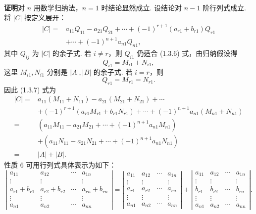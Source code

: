 \documentclass[UTF8,12pt,a4paper,fontset=fandol]{ctexart}
\begin{document}
\noindent\textbf{证明}\quad 对 $n$ 用数学归纳法，$n=1$ 时结论显然成立. 设结论对 $n-1$ 阶行列式成立. 将 $|C|$ 按定义展开：
\begin{equation}
\begin{aligned}
|C|={}&a_{11}Q_{11}-a_{21}Q_{21}+\cdots+(-1)^{r+1}(a_{r1}+b_{r1})Q_{r1}\\
&+\cdots+(-1)^{n+1}a_{n1}Q_{n1},
\end{aligned}
\tag{1.3.7}
\end{equation}
其中 $Q_{ij}$ 为 $|C|$ 的余子式. 若 $i\ne r$，则 $Q_{i1}$ 仍适合 (1.3.6) 式，由归纳假设得
\[
Q_{i1}=M_{i1}+N_{i1},
\]
这里 $M_{i1},N_{i1}$ 分别是 $|A|,|B|$ 的余子式. 若 $i=r$，则
\[
Q_{r1}=M_{r1}=N_{r1}.
\]
因此 (1.3.7) 式为
\[
\begin{aligned}
|C|={}&a_{11}(M_{11}+N_{11})-a_{21}(M_{21}+N_{21})+\cdots\\
&+(-1)^{r+1}(a_{r1}M_{r1}+b_{r1}N_{r1})+\cdots+(-1)^{n+1}a_{n1}(M_{n1}+N_{n1})\\
={}&(a_{11}M_{11}-a_{21}M_{21}+\cdots+(-1)^{n+1}a_{n1}M_{n1})\\
&+(a_{11}N_{11}-a_{21}N_{21}+\cdots+(-1)^{n+1}a_{n1}N_{n1})\\
={}&|A|+|B|.
\end{aligned}
\]
性质 6 可用行列式具体表示为如下：
\[
\left|\begin{array}{cccc}
a_{11} & a_{12} & \cdots & a_{1n}\\
\vdots & \vdots & & \vdots\\
a_{r1}+b_{r1} & a_{r2}+b_{r2} & \cdots & a_{rn}+b_{rn}\\
\vdots & \vdots & & \vdots\\
a_{n1} & a_{n2} & \cdots & a_{nn}
\end{array}\right|
=
\left|\begin{array}{cccc}
a_{11} & a_{12} & \cdots & a_{1n}\\
\vdots & \vdots & & \vdots\\
a_{r1} & a_{r2} & \cdots & a_{rn}\\
\vdots & \vdots & & \vdots\\
a_{n1} & a_{n2} & \cdots & a_{nn}
\end{array}\right|
+
\left|\begin{array}{cccc}
a_{11} & a_{12} & \cdots & a_{1n}\\
\vdots & \vdots & & \vdots\\
b_{r1} & b_{r2} & \cdots & b_{rn}\\
\vdots & \vdots & & \vdots\\
a_{n1} & a_{n2} & \cdots & a_{nn}
\end{array}\right|.
\]
\end{document}
